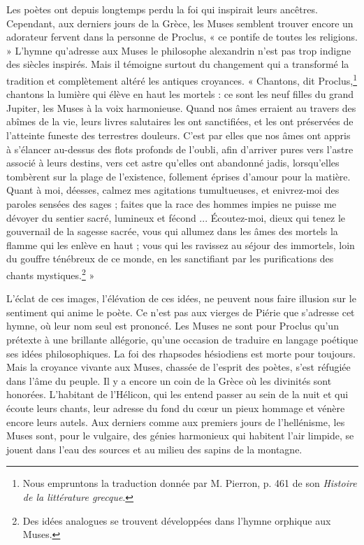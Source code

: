 \documentclass[a4paper, 11pt, oneside, polutonikogreek, french]{article}
\begin{document}
Les poètes ont depuis longtemps perdu la foi qui inspirait leurs ancêtres. Cependant, aux derniers jours de la Grèce, les Muses semblent trouver encore un adorateur fervent dans la personne de Proclus, « ce pontife de toutes les religions. » L'hymne qu'adresse aux Muses le philosophe alexandrin n'est pas trop indigne des siècles inspirés. Mais il témoigne surtout du changement qui a transformé la tradition et complètement altéré les antiques croyances. « Chantons, dit Proclus,\footnote{Nous empruntons la traduction donnée par M. Pierron, p. 461 de son \emph{Histoire de la littérature grecque}.} chantons la lumière qui élève en haut les mortels : ce sont les neuf filles du grand Jupiter, les Muses à la voix harmonieuse. Quand nos âmes erraient au travers des abîmes de la vie, leurs livres salutaires les ont sanctifiées, et les ont préservées de l'atteinte funeste des terrestres douleurs. C'est par elles que nos âmes ont appris à s'élancer au-dessus des flots profonds de l'oubli, afin d'arriver pures vers l'astre associé à leurs destins, vers cet astre qu'elles ont abandonné jadis, lorsqu'elles tombèrent sur la plage de l'existence, follement éprises d'amour pour la matière. Quant à moi, déesses, calmez mes agitations tumultueuses, et enivrez-moi des paroles sensées des sages ; faites que la race des hommes impies ne puisse me dévoyer du sentier sacré, lumineux et fécond ... Écoutez-moi, dieux qui tenez le gouvernail de la sagesse sacrée, vous qui allumez dans les âmes des mortels la flamme qui les enlève en haut ; vous qui les ravissez au séjour des immortels, loin du gouffre ténébreux de ce monde, en les sanctifiant par les purifications des chants mystiques.\footnote{Des idées analogues se trouvent développées dans l'hymne orphique aux Muses.} »

L'éclat de ces images, l'élévation de ces idées, ne peuvent nous faire illusion sur le sentiment qui anime le poète. Ce n'est pas aux vierges de Piérie que s'adresse cet hymne, où leur nom seul est prononcé. Les Muses ne sont pour Proclus qu'un prétexte à une brillante allégorie, qu'une occasion de traduire en langage poétique ses idées philosophiques. La foi des rhapsodes hésiodiens est morte pour toujours. Mais la croyance vivante aux Muses, chassée de l'esprit des poètes, s'est réfugiée dans l'âme du peuple. Il y a encore un coin de la Grèce où les divinités sont honorées. L'habitant de l'Hélicon, qui les entend passer au sein de la nuit et qui écoute leurs chants, leur adresse du fond du cœur un pieux hommage et vénère encore leurs autels. Aux derniers comme aux premiers jours de l'hellénisme, les Muses sont, pour le vulgaire, des génies harmonieux qui habitent l'air limpide, se jouent dans l'eau des sources et au milieu des sapins de la montagne.
\clearpage
\end{document}
